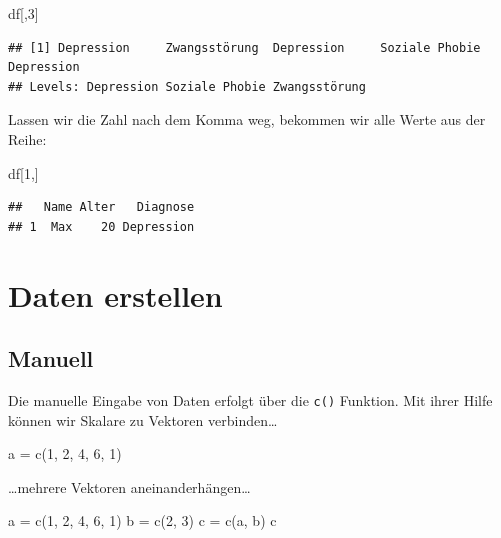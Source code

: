 \documentclass[
]{book}
\newenvironment{Shaded}{\begin{snugshade}}{\end{snugshade}}
\newcommand{\DecValTok}[1]{\textcolor[rgb]{0.00,0.00,0.81}{#1}}
\newcommand{\FunctionTok}[1]{\textcolor[rgb]{0.00,0.00,0.00}{#1}}
\newcommand{\NormalTok}[1]{#1}
\newcommand{\OtherTok}[1]{\textcolor[rgb]{0.56,0.35,0.01}{#1}}
\begin{document}
\begin{Shaded}
\begin{Highlighting}[]
\NormalTok{df[,}\DecValTok{3}\NormalTok{]}
\end{Highlighting}
\end{Shaded}

\begin{verbatim}
## [1] Depression     Zwangsstörung  Depression     Soziale Phobie Depression    
## Levels: Depression Soziale Phobie Zwangsstörung
\end{verbatim}

Lassen wir die Zahl nach dem Komma weg, bekommen wir alle Werte aus der Reihe:

\begin{Shaded}
\begin{Highlighting}[]
\NormalTok{df[}\DecValTok{1}\NormalTok{,]}
\end{Highlighting}
\end{Shaded}

\begin{verbatim}
##   Name Alter   Diagnose
## 1  Max    20 Depression
\end{verbatim}

\hypertarget{daten-erstellen}{%
\chapter{Daten erstellen}\label{daten-erstellen}}

\hypertarget{manuell}{%
\section{Manuell}\label{manuell}}

Die manuelle Eingabe von Daten erfolgt über die \texttt{c()} Funktion. Mit ihrer Hilfe können wir Skalare zu Vektoren verbinden\ldots{}

\begin{Shaded}
\begin{Highlighting}[]
\NormalTok{a }\OtherTok{=} \FunctionTok{c}\NormalTok{(}\DecValTok{1}\NormalTok{, }\DecValTok{2}\NormalTok{, }\DecValTok{4}\NormalTok{, }\DecValTok{6}\NormalTok{, }\DecValTok{1}\NormalTok{)}
\end{Highlighting}
\end{Shaded}

\ldots mehrere Vektoren aneinanderhängen\ldots{}

\begin{Shaded}
\begin{Highlighting}[]
\NormalTok{a }\OtherTok{=} \FunctionTok{c}\NormalTok{(}\DecValTok{1}\NormalTok{, }\DecValTok{2}\NormalTok{, }\DecValTok{4}\NormalTok{, }\DecValTok{6}\NormalTok{, }\DecValTok{1}\NormalTok{)}
\NormalTok{b }\OtherTok{=} \FunctionTok{c}\NormalTok{(}\DecValTok{2}\NormalTok{, }\DecValTok{3}\NormalTok{)}
\NormalTok{c }\OtherTok{=} \FunctionTok{c}\NormalTok{(a, b)}
\NormalTok{c}
\end{Highlighting}
\end{Shaded}
\end{document}
